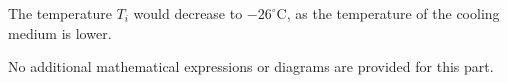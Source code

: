 The temperature \( T_i \) would decrease to \( -26^\circ\text{C} \), as the temperature of the cooling medium is lower.  

No additional mathematical expressions or diagrams are provided for this part.